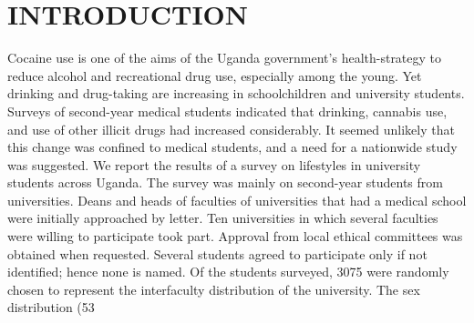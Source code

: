 \documentclass[14pt]{article}
\begin{document}
\section{INTRODUCTION}
Cocaine use is one of the aims of the Uganda government’s health-strategy to reduce alcohol and recreational drug use, especially among the young. Yet drinking and drug-taking are increasing in schoolchildren and university students. Surveys of second-year medical students indicated that drinking, cannabis use, and use of other illicit drugs had increased considerably. It seemed unlikely that this change was confined to medical students, and a need for a nationwide study was suggested. We report the results of a survey on lifestyles in university students across Uganda. The survey was mainly on second-year students from universities. Deans and heads of faculties of universities that had a medical school were initially approached by letter. Ten universities in which several faculties were willing to participate took part. Approval from local ethical committees was obtained when requested. Several students agreed to participate only if not identified; hence none is named. Of the students surveyed, 3075 were randomly chosen to represent the interfaculty distribution of the university. The sex distribution (53%
\end{document}

